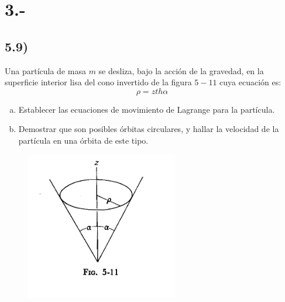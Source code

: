\documentclass{article}
\begin{document}
\section*{3.-}
\subsection*{5.9)}
Una partícula de masa $m$ se desliza, bajo la acción de la gravedad, en la superficie interior
lisa del cono invertido de la figura $5-11$ cuya ecuación es:
\[ \rho = zth\alpha \]
\begin{enumerate}[a)]
    \item Establecer las ecuaciones de movimiento de Lagrange para la partícula.
    \item Demostrar que son posibles órbitas circulares, y hallar la velocidad de la 
    partícula en una órbita de este tipo.
\end{enumerate}
\begin{figure}[H]
    \centering
    \includegraphics[scale=1]{p3_cone.png}
\end{figure}
\end{document}
